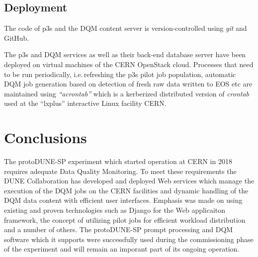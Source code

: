 \documentclass{webofc}
\newcommand{\pd}{protoDUNE\xspace}
\begin{document}
\subsection{Deployment}

The code of p3s and the DQM content server is version-controlled using \textit{git}
and GitHub.

The p3s and DQM services as well as their back-end database server have been deployed on
virtual machines of the CERN OpenStack cloud. Processes that need to be run periodically,
i.e.\,refreshing the p3s pilot job population, automatic DQM job generation based on detection
of fresh raw data written to EOS etc are maintained using \textit{``acrontab''} which is a kerberized
distributed version of \textit{crontab} used at the ``lxplus'' interactive Linux facility CERN.

\section{Conclusions}

The \pd-SP experiment which started operation at CERN in 2018 requires adequate Data
Quality Monitoring. To meet these requirements the DUNE Collaboration has developed
and deployed Web services which manage the execution of the DQM jobs on the CERN
facilities and dynamic handling of the DQM data content with efficient user interfaces.
Emphasis was made on using existing and proven technologies such as Django
for the Web applicaiton framework, the concept of utilizing pilot jobs for
efficient workload distribution and a number of others. The \pd-SP prompt
processing and DQM software which it supports were successfully used during
the commissioning phase of the experiment and will remain an imporant part
of its ongoing operation.

%
% 
%
%
\end{document}
